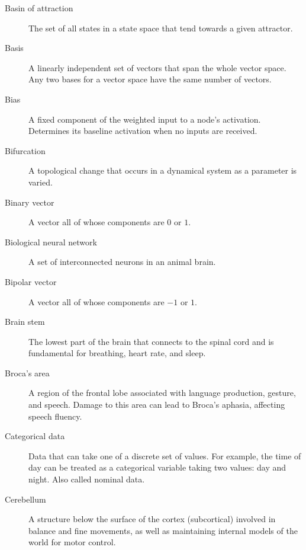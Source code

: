 \begin{description}
\item[Basin of attraction] The set of all states in a state space that tend 
towards a given attractor.

\item[Basis] A linearly independent set of vectors that span the whole vector space. Any two bases for a vector space have the same number of vectors.

\item[Bias] A fixed component of the weighted input to a node's activation. Determines its baseline activation when no inputs are received.

\item[Bifurcation] A topological change that occurs in a dynamical system as a parameter is varied.

\item[Binary vector] A vector all of whose components are $0$ or $1$.

\item[Biological neural network] A set of interconnected neurons in an animal brain.

\item[Bipolar vector] A vector all of whose components are $-1$ or $1$.


\item[Brain stem] The lowest part of the brain that connects to the spinal cord and is fundamental for breathing, heart rate, and sleep.

\item[Broca's area] A region of the frontal lobe associated with language production, gesture, and speech. Damage to this area can lead to Broca's aphasia, affecting speech fluency.

\item[Categorical data] Data that can take one of a discrete set of values. For example, the time of day can be treated as a categorical variable taking two values: day and night. Also called nominal data.

\item[Cerebellum] A structure below the surface of the cortex (subcortical) involved in balance and fine movements, as well as maintaining internal models of the world for motor control.


\end{description}
